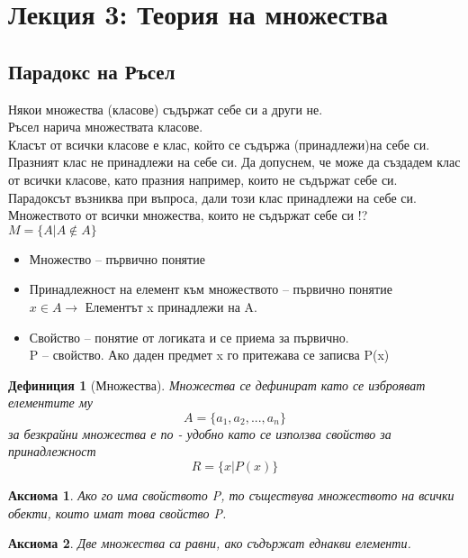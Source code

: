 \documentclass[fleqn, 12pt]{article}
\newtheorem{definition}{Дефиниция}[subsection]
\newtheorem{axiom}{Аксиома}[subsection]
\begin{document}
\newpage

\section{Лекция 3: Теория на множества}

\subsection{Парадокс на Ръсел}
Някои множества (класове) съдържат себе си а други не.\\
Ръсел нарича множествата класове.\\
Класът от всички класове е клас, който се съдържа (принадлежи)на себе си. Празният клас не принадлежи на себе си. Да допуснем, че може да създадем клас от всички класове, като празния например, които не съдържат себе си.\\
Парадоксът възниква при въпроса, дали този клас принадлежи на себе си. \\
Множеството от всички множества, които не съдържат себе си !? \\
$M = \{ A | A \notin A \}$\\
\begin{itemize}
	\item Множество – първично понятие
	\item Принадлежност на елемент към множеството – първично понятие \\
$x\in A \rightarrow$ Елементът x принадлежи на A.
	\item Свойство – понятие от логиката и се приема за първично. \\
P – свойство. Ако даден предмет x го притежава се записва P(x)
\end{itemize}

\begin{definition}[Множества]
Множества се дефинират като се изброяват елементите му 
$$A = \{ a_1, a_2, ..., a_n\}$$
за безкрайни множества е по - удобно като се използва свойство за принадлежност 
$$R = \{x | P(x) \} $$
\end{definition}

\begin{axiom}
Ако го има свойството P, то съществува множеството на всички обекти, които имат това свойство P.
\end{axiom}

\begin{axiom}
Две множества са равни, ако съдържат еднакви елементи.
\end{axiom}
\end{document}
